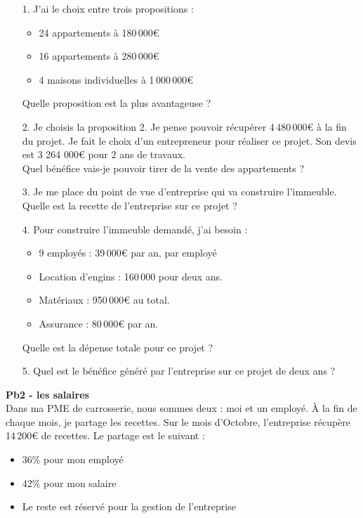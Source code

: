 \begin{enumerate}
  \item[1.] J'ai le choix entre trois propositions : 

    \begin{itemize}[label={$\bullet$}]
        \item 24 appartements à 180\,000€
        \item 16 appartements à 280\,000€
        \item 4 maisons individuelles à 1\,000\,000€
    \end{itemize}
    Quelle proposition est la plus avantageuse ?
  
  \item[2.] Je choisis la proposition 2. Je pense pouvoir récupérer 4\,480\,000€ à la fin du projet. \newline
    Je fait le choix d'un entrepreneur pour réaliser ce projet. Son devis est 3 264 000€ pour 2 ans de travaux. \\
  Quel bénéfice vais-je pouvoir tirer de la vente des appartements ?

  \item[3.] Je me place du point de vue d'entreprise qui va construire l'immeuble. \\
    Quelle est la recette de l'entreprise sur ce projet ?

  \item[4.] Pour construire l'immeuble demandé, j'ai besoin :
    \begin{itemize}[label={$\bullet$}]
      \item 9 employés : 39\,000€ par an, par employé
      \item Location d'engins : 160\,000 pour deux ans.
      \item Matériaux : 950\,000€ au total.
      \item Assurance : 80\,000€ par an.
    \end{itemize}
  Quelle est la dépense totale pour ce projet ?

  \item[5.] Quel est le bénéfice généré par l'entreprise sur ce projet de deux ans ? \\

\end{enumerate}

\textbf{Pb2 - les salaires}\\

Dans ma PME de carrosserie, nous sommes deux : moi et un employé. À la fin de chaque mois, je partage les recettes. Sur le mois d'Octobre, l'entreprise récupère 14\,200€ de recettes. \newline
Le partage est le suivant : 
\begin{itemize}[label={$\bullet$}]
  \item 36\% pour mon employé
  \item 42\% pour mon salaire
  \item Le reste est réservé pour la gestion de l'entreprise
\end{itemize}

